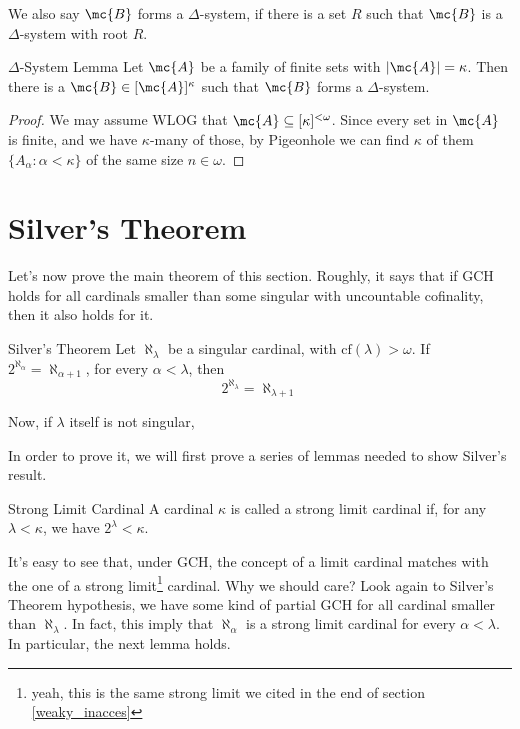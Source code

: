 We also say $\mc{B}$ forms a $\Delta$-system, if there is a set $R$ such that $\mc{B}$ is a $\Delta$-system with root $R$.

\begin{corollary}{$\Delta$-System Lemma}{}
    Let $\mc{A}$ be a family of finite sets with $\lvert\mc{A}\rvert=\kappa$. Then there is a $\mc{B}\in[\mc{A}]^\kappa$ such that $\mc{B}$ forms a $\Delta$-system.
\end{corollary}

\begin{proof}
    We may assume WLOG that $\mc{A}\subseteq[\kappa]^{<\omega}$. Since every set in $\mc{A}$ is finite, and we have $\kappa$-many of those, by Pigeonhole we can find $\kappa$ of them $\{A_\alpha:\alpha<\kappa\}$ of the same size $n\in\omega$.
    
\end{proof}

\section{Silver's Theorem}

Let's now prove the main theorem of this section. Roughly, it says that if GCH holds for all cardinals smaller than some singular with uncountable cofinality, then it also holds for it.

\begin{theorem}{Silver's Theorem}{}
    Let $\aleph_\lambda$ be a singular cardinal, with $\text{cf}(\lambda)>\omega$. If $2^{\aleph_\alpha}=\aleph_{\alpha+1}$, for every $\alpha<\lambda$, then
    $$2^{\aleph_\lambda}=\aleph_{\lambda+1}$$
\end{theorem}

Now, if $\lambda$ itself is not singular, 


In order to prove it, we will first prove a series of lemmas needed to show Silver's result.

\begin{definition}{Strong Limit Cardinal}{}
    A cardinal $\kappa$ is called a \textcolor{laser_eyes!80!black}{strong limit cardinal} if, for any $\lambda<\kappa$, we have $2^\lambda<\kappa$.
\end{definition}

It's easy to see that, under GCH, the concept of a limit cardinal matches with the one of a strong limit\footnote{yeah, this is the same strong limit we cited in the end of section \ref{weaky_inacces}} cardinal. Why we should care? Look again to Silver's Theorem hypothesis, we have some kind of partial GCH for all cardinal smaller than $\aleph_\lambda$. In fact, this imply that $\aleph_\alpha$ is a strong limit cardinal for every $\alpha<\lambda$. In particular, the next lemma holds.

